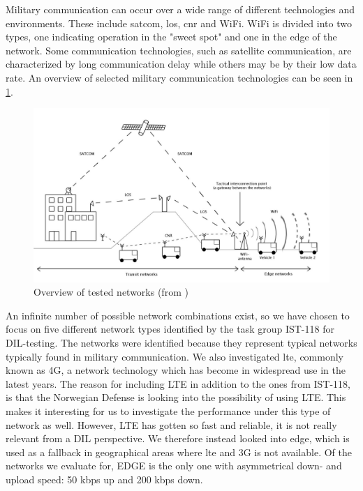 Military communication can occur over a wide range of different technologies and
environments. These include \gls{satcom}, \gls{los}, \gls{cnr} and WiFi. WiFi is
divided into two types, one indicating operation in the "sweet spot" and one in
the edge of the network. Some communication technologies, such as satellite
communication, are characterized by long communication delay while others may be
by their low data rate. An overview of selected military communication
technologies can be seen in \cref{figure-networks-overview}.

\begin{figure}[h]
\includegraphics[width=\textwidth]{images/networks_overview.pdf}
\caption{Overview of tested networks (from \cite{krog-pisa})}
\label{figure-networks-overview}
\end{figure}

An infinite number of possible network combinations exist, so we have chosen to
focus on five different network types identified by the task group IST-118 for
DIL-testing. The networks were identified because they represent typical
networks typically found in military communication. We also investigated
\gls{lte}, commonly known as 4G, a network technology which has become in
widespread use in the latest years. The reason for including LTE in addition to
the ones from IST-118, is that the Norwegian Defense is looking into the
possibility of using LTE. This makes it interesting for us to investigate the
performance under this type of network as well. However, LTE has gotten so fast
and reliable, it is not really relevant from a DIL perspective. We therefore
instead looked into \gls{edge}, which is used as a fallback in geographical
areas where \gls{lte} and 3G is not available. Of the networks we evaluate for,
EDGE is the only one with asymmetrical down- and upload speed: 50 kbps up and 200
kbps down.

